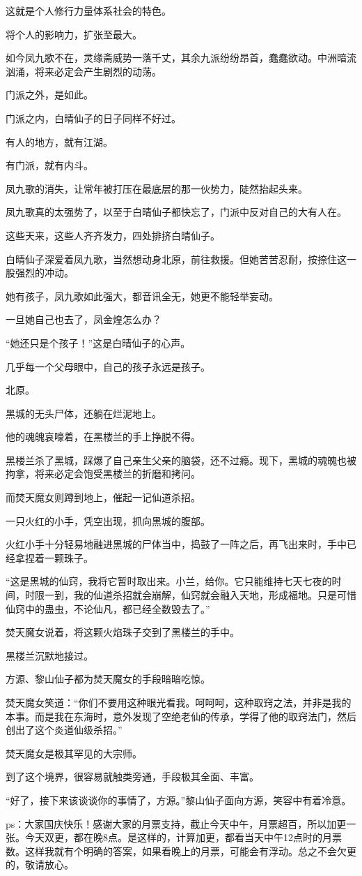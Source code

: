 \begin{this_body}
这就是个人修行力量体系社会的特色。

将个人的影响力，扩张至最大。

如今凤九歌不在，灵缘斋威势一落千丈，其余九派纷纷昂首，蠢蠢欲动。中洲暗流汹涌，将来必定会产生剧烈的动荡。

门派之外，是如此。

门派之内，白晴仙子的日子同样不好过。

有人的地方，就有江湖。

有门派，就有内斗。

凤九歌的消失，让常年被打压在最底层的那一伙势力，陡然抬起头来。

凤九歌真的太强势了，以至于白晴仙子都快忘了，门派中反对自己的大有人在。

这些天来，这些人齐齐发力，四处排挤白晴仙子。

白晴仙子深爱着凤九歌，当然想动身北原，前往救援。但她苦苦忍耐，按捺住这一股强烈的冲动。

她有孩子，凤九歌如此强大，都音讯全无，她更不能轻举妄动。

一旦她自己也去了，凤金煌怎么办？

“她还只是个孩子！”这是白晴仙子的心声。

几乎每一个父母眼中，自己的孩子永远是孩子。

北原。

黑城的无头尸体，还躺在烂泥地上。

他的魂魄哀嚎着，在黑楼兰的手上挣脱不得。

黑楼兰杀了黑城，踩爆了自己亲生父亲的脑袋，还不过瘾。现下，黑城的魂魄也被拘拿，将来必定会饱受黑楼兰的折磨和拷问。

而焚天魔女则蹲到地上，催起一记仙道杀招。

一只火红的小手，凭空出现，抓向黑城的腹部。

火红小手十分轻易地融进黑城的尸体当中，捣鼓了一阵之后，再飞出来时，手中已经拿捏着一颗珠子。

“这是黑城的仙窍，我将它暂时取出来。小兰，给你。它只能维持七天七夜的时间，时限一到，我的仙道杀招就会崩解，仙窍就会融入天地，形成福地。只是可惜仙窍中的蛊虫，不论仙凡，都已经全数毁去了。”

焚天魔女说着，将这颗火焰珠子交到了黑楼兰的手中。

黑楼兰沉默地接过。

方源、黎山仙子都为焚天魔女的手段暗暗吃惊。

焚天魔女笑道：“你们不要用这种眼光看我。呵呵呵，这种取窍之法，并非是我的本事。而是我在东海时，意外发现了空绝老仙的传承，学得了他的取窍法门，然后创出了这个炎道仙级杀招。”

焚天魔女是极其罕见的大宗师。

到了这个境界，很容易就触类旁通，手段极其全面、丰富。

“好了，接下来该谈谈你的事情了，方源。”黎山仙子面向方源，笑容中有着冷意。

ps：大家国庆快乐！感谢大家的月票支持，截止今天中午，月票超百，所以加更一张。今天双更，都在晚8点。是这样的，计算加更，都看当天中午12点时的月票数。这样我就有个明确的答案，如果看晚上的月票，可能会有浮动。总之不会欠更的，敬请放心。

\end{this_body}

